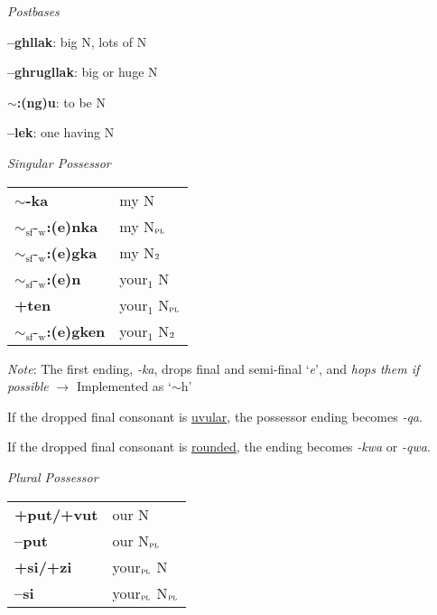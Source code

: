 \documentclass{article}
\begin{document}
\textit{Postbases}
\begin{description}
\item \textbf{--ghllak}: big N, lots of N
\item \textbf{--ghrugllak}: big or huge N
\item \textbf{$\sim$:(ng)u}: to be N
\item \textbf{--lek}: one having N
\end{description}

\bigskip

\textit{Singular Possessor} \\
\begin{tabular}{ l l }
\textbf{$\sim$-ka} & my N \\
\textbf{${\sim}_\text{sf}\text{-}_\text{w}$:(e)nka} & my N$_\text{\textsc{pl}}$ \\
\textbf{${\sim}_\text{sf}\text{-}_\text{w}$:(e)gka} & my N$_\text{\textsc{2}}$ \\
\textbf{${\sim}_\text{sf}\text{-}_\text{w}$:(e)n} & your$_1$ N \\
\textbf{+ten} & your$_1$ N$_\text{\textsc{pl}}$ \\
\textbf{${\sim}_\text{sf}\text{-}_\text{w}$:(e)gken} & your$_1$ N$_\text{\textsc{2}}$ \\
\end{tabular}

\bigskip

\textit{Note}: The first ending, \textit{-ka}, drops final and semi-final `\textit{e}', and \textit{hops them if possible} $\rightarrow$ Implemented as `$\sim$h'

If the dropped final consonant is \underline{uvular}, the possessor ending becomes \textit{-qa}.

If the dropped final consonant is \underline{rounded}, the ending becomes \textit{-kwa} or \textit{-qwa}.

\bigskip

\textit{Plural Possessor} \\
\begin{tabular}{ l l }
\textbf{+put/+vut} & our N \\
\textbf{--put} & our N$_\text{\textsc{pl}}$ \\
\textbf{+si/+zi} & your$_\text{\textsc{pl}}$ N \\
\textbf{--si} & your$_\text{\textsc{pl}}$ N$_\text{\textsc{pl}}$ \\
\end{tabular}
\end{document}
